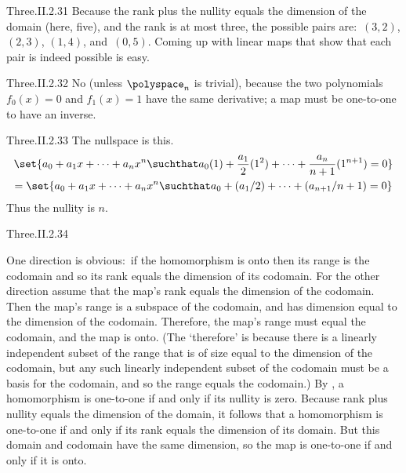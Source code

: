 \begin{ans}{Three.II.2.31}
      Because the rank plus the nullity equals the dimension of the domain
      (here, five), and the rank is at most three,
      the possible pairs are:~\( (3,2) \), \( (2,3) \),
      \( (1,4) \), and~\( (0,5) \).
      Coming up with linear maps that show that each pair is indeed
      possible is easy.
    
\end{ans}
\begin{ans}{Three.II.2.32}
      No (unless \( \polyspace_n \) is trivial), because the two polynomials
      \( f_0(x)=0 \) and \( f_1(x)=1 \) have the same derivative; a map must be
      one-to-one to have an inverse.
    
\end{ans}
\begin{ans}{Three.II.2.33}
      The nullspace is this.
      \begin{multline*}
        \set{a_0+a_1x+\dots+a_nx^n\suchthat
                   a_0(1)+\frac{\displaystyle a_1}{\displaystyle 2}(1^2)
                   +\dots
                   +\frac{\displaystyle a_n}{\displaystyle n+1}(1^{n+1})=0} \\
        =\set{a_0+a_1x+\dots+a_nx^n\suchthat
                   a_0+(a_1/2)+\dots+(a_{n+1}/n+1)=0}
      \end{multline*}
      Thus the nullity is \( n \).
     
\end{ans}
\begin{ans}{Three.II.2.34}
      \begin{exparts}
        \partsitem One direction is obvious:~if the homomorphism
          is onto then its range is the codomain and so its
          rank equals the dimension of its codomain.
          For the other direction assume that the map's rank equals the
          dimension of the codomain.
          Then the map's range is a subspace of the codomain, and has
          dimension equal to the dimension of the codomain.
          Therefore, the map's range must equal the codomain, and the
          map is onto.
          (The `therefore' is because
          there is a linearly independent subset of the range that is
          of size  equal to the dimension of the codomain,
          but any such linearly independent subset of the codomain must be a
          basis for the codomain, and so the range equals the codomain.)
        \partsitem By ,
          a homomorphism is one-to-one if and only if its nullity is zero.
          Because rank plus nullity equals the dimension of the domain,
          it follows that a homomorphism is one-to-one if and only
          if its rank equals the dimension of its domain.
          But this domain and codomain have the same dimension,
          so the map is one-to-one if and only if it is onto.
      \end{exparts}
   
\end{ans}
